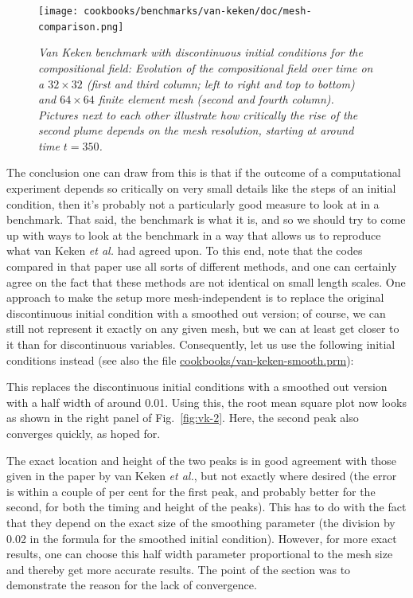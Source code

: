 \documentclass{article}
\begin{document}
\begin{figure}
  \centering
  \texttt{[image: cookbooks/benchmarks/van-keken/doc/mesh-comparison.png]}
  \caption{\it Van Keken benchmark with discontinuous initial conditions for the
  compositional field:
  Evolution of the compositional field over time on a $32\times 32$ (first and
  third column; left to right and top to bottom) and $64\times 64$ finite
  element mesh (second and fourth column). Pictures next to each other
  illustrate how critically the rise of the second plume depends on
  the mesh resolution, starting at around time $t=350$.}
  \label{fig:vk-4}
\end{figure}

The conclusion one can draw from this is that if the outcome of a computational
experiment depends so critically on very small details like the steps of an
initial condition, then it's probably not a particularly good measure to look at
in a benchmark. That said, the benchmark is what it is, and so we should try to
come up with ways to look at the benchmark in a way that allows us to reproduce
what van Keken \textit{et al.} had agreed upon. To this end, note that the codes
compared in that paper use all sorts of different methods, and one can certainly
agree on the fact that these methods are not identical on small length scales.
One approach to make the setup more mesh-independent is to replace the original
discontinuous initial condition with a smoothed out version; of course, we can
still not represent it exactly on any given mesh, but we can at least get closer
to it than for discontinuous variables. Consequently, let us use the following
initial conditions instead (see also the file
\url{cookbooks/van-keken-smooth.prm}):



This replaces the discontinuous initial conditions with a smoothed out version
with a half width of around 0.01. Using this, the root mean square plot now
looks as shown in the right panel of Fig.~\ref{fig:vk-2}. Here, the second peak
also converges quickly, as hoped for.

The exact location and height of the two peaks is in good agreement with those
given in the paper by van Keken \textit{et al.}, but not exactly where desired
(the error is within a couple of per cent for the first peak, and probably
better for the second, for both the timing and height of the peaks).
This has to do with the fact that they depend on the exact size of the smoothing
parameter (the division by 0.02 in the formula for the smoothed initial
condition). However, for more exact results, one can choose
this half width parameter proportional to the mesh size and thereby get more
accurate results. The point of the section was to demonstrate the reason
for the lack of convergence.
\end{document}

